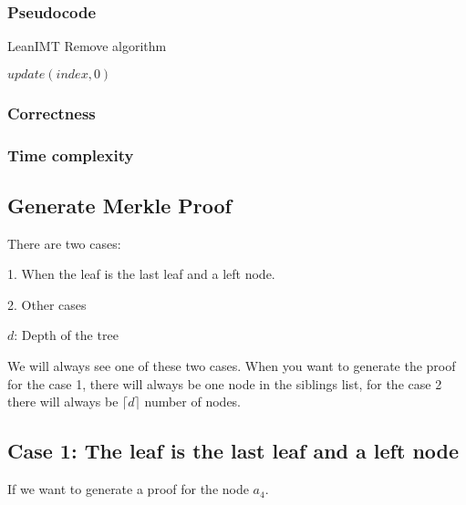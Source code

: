 \documentclass{article}
\begin{document}
\bigbreak

\subsubsection{Pseudocode}

\begin{algorithm}[H]
    \caption{LeanIMT Remove algorithm}\label{remove}
    \begin{algorithmic}[1]
        \State $update(index, 0)$
        \EndProcedure
    \end{algorithmic}
\end{algorithm}

\bigbreak

\subsubsection{Correctness}

\bigbreak

\subsubsection{Time complexity}

\bigbreak

\subsection{Generate Merkle Proof}

There are two cases:

1. When the leaf is the last leaf and a left node.

2. Other cases

\bigbreak

$d$: Depth of the tree

We will always see one of these two cases. When you want to generate the proof for the case 1, there will always be one node in the siblings list, for the case 2 there will always be $\lceil d \rceil$ number of nodes.

\bigbreak

\subsection*{Case 1: The leaf is the last leaf and a left node}

\bigbreak

If we want to generate a proof for the node $a_4$.
\end{document}
